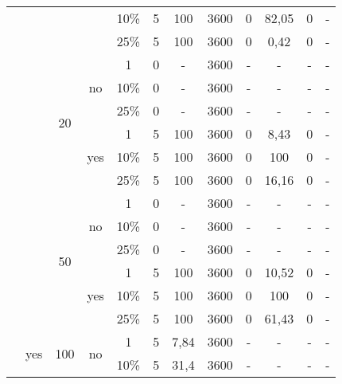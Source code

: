 \begin{table}[h!]
{\begin{tabular}{cccccccccccc}
            &       &       &       & 10\%  & 5     & 100   & 3600  & 0     & 82,05 & 0     & - \\
            &       &       &       & 25\%  & 5     & 100   & 3600  & 0     & 0,42  & 0     & - \bigstrut[b]\\
            \cline{3-12}          &       & \multirow{6}[4]{*}{20} & \multirow{3}[2]{*}{no} & 1     & 0     & -     & 3600  & -     & -     & -     & - \bigstrut[t]\\
            &       &       &       & 10\%  & 0     & -     & 3600  & -     & -     & -     & - \\
            &       &       &       & 25\%  & 0     & -     & 3600  & -     & -     & -     & - \bigstrut[b]\\
            \cline{4-12}          &       &       & \multirow{3}[2]{*}{yes} & 1     & 5     & 100   & 3600  & 0     & 8,43  & 0     & - \bigstrut[t]\\
            &       &       &       & 10\%  & 5     & 100   & 3600  & 0     & 100   & 0     & - \\
            &       &       &       & 25\%  & 5     & 100   & 3600  & 0     & 16,16 & 0     & - \bigstrut[b]\\
            \cline{3-12}          &       & \multirow{6}[4]{*}{50} & \multirow{3}[2]{*}{no} & 1     & 0     & -     & 3600  & -     & -     & -     & - \bigstrut[t]\\
            &       &       &       & 10\%  & 0     & -     & 3600  & -     & -     & -     & - \\
            &       &       &       & 25\%  & 0     & -     & 3600  & -     & -     & -     & - \bigstrut[b]\\
            \cline{4-12}          &       &       & \multirow{3}[2]{*}{yes} & 1     & 5     & 100   & 3600  & 0     & 10,52 & 0     & - \bigstrut[t]\\
            &       &       &       & 10\%  & 5     & 100   & 3600  & 0     & 100   & 0     & - \\
            &       &       &       & 25\%  & 5     & 100   & 3600  & 0     & 61,43 & 0     & - \bigstrut[b]\\
            \cline{2-12}          & \multirow{6}[4]{*}{yes} & \multirow{6}[4]{*}{100} & \multirow{3}[2]{*}{no} & 1     & 5     & 7,84  & 3600  & -     & -     & -     & - \bigstrut[t]\\
            &       &       &       & 10\%  & 5     & 31,4  & 3600  & -     & -     & -     & - \\

\end{tabular}}
\end{table}
